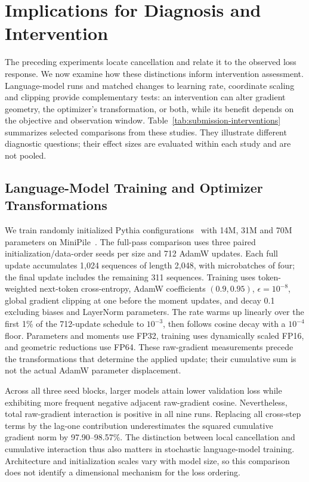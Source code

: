 \section{Implications for Diagnosis and Intervention}
\label{sec:implications}

The preceding experiments locate cancellation and relate it to the observed
loss response. We now examine how these distinctions inform intervention
assessment. Language-model runs and matched changes to learning rate,
coordinate scaling and clipping provide complementary tests: an intervention
can alter gradient geometry, the optimizer's transformation, or both, while
its benefit depends on the objective and observation window.
Table~\ref{tab:submission-interventions} summarizes selected comparisons from
these studies. They illustrate different diagnostic questions; their effect
sizes are evaluated within each study and are not pooled.

\subsection{Language-Model Training and Optimizer Transformations}

We train randomly initialized Pythia configurations~\cite{biderman2023pythia}
with 14M, 31M and 70M parameters on MiniPile~\cite{kaddour2023minipile}.
The full-pass comparison uses three paired initialization/data-order seeds
per size and 712 AdamW updates. Each full update accumulates 1,024 sequences
of length 2,048, with microbatches of four; the final update includes the
remaining 311 sequences. Training uses token-weighted next-token
cross-entropy, AdamW coefficients $(0.9,0.95)$, $\epsilon=10^{-8}$,
global gradient clipping at one before the moment updates, and decay
0.1 excluding biases and LayerNorm parameters. The rate warms up linearly
over the first 1\% of the 712-update schedule to $10^{-3}$, then follows
cosine decay with a $10^{-4}$ floor. Parameters and moments
use FP32, training uses dynamically scaled FP16, and geometric reductions
use FP64. These raw-gradient measurements precede the transformations
that determine the applied update; their cumulative sum is not the
actual AdamW parameter displacement.

Across all three seed blocks, larger models attain lower validation loss
while exhibiting more frequent negative adjacent raw-gradient cosine.
Nevertheless, total raw-gradient interaction is positive in all nine runs.
Replacing all cross-step terms by the lag-one contribution underestimates
the squared cumulative gradient norm by 97.90--98.57\%. The distinction
between local cancellation and cumulative interaction thus also matters
in stochastic language-model training. Architecture and initialization
scales vary with model size, so this comparison does not identify a
dimensional mechanism for the loss ordering.

